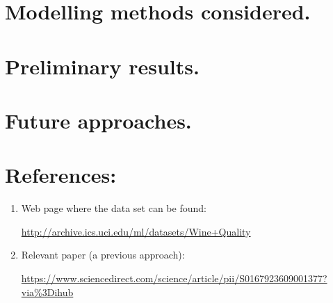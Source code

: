 \documentclass[10pt]{article}
\begin{document}
\section{Modelling methods considered.}

\section{Preliminary results.}

\section{Future approaches.}

\section{References:}
\begin{enumerate}
  \item Web page where the data set can be found:

  \href{http://archive.ics.uci.edu/ml/datasets/Wine+Quality}{ http://archive.ics.uci.edu/ml/datasets/Wine+Quality}

  \item Relevant paper (a previous approach):

  \href{https://www.sciencedirect.com/science/article/pii/S0167923609001377?via\%3Dihub}{ https://www.sciencedirect.com/science/article/pii/S0167923609001377?via\%3Dihub}


\end{enumerate}
\end{document}
